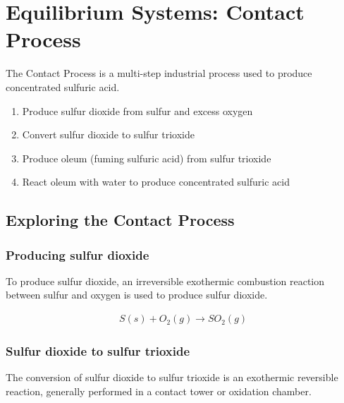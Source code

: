 \documentclass[12pt, a4paper]{article}
\begin{document}
\maketitle





\section{Equilibrium Systems: Contact Process}

The Contact Process is a multi-step industrial process used to produce concentrated sulfuric acid. 

\begin{enumerate}
	\item Produce sulfur dioxide from sulfur and excess oxygen
	\item Convert sulfur dioxide to sulfur trioxide
	\item Produce oleum (fuming sulfuric acid) from sulfur trioxide
	\item React oleum with water to produce concentrated sulfuric acid
\end{enumerate}






\subsection{Exploring the Contact Process}

\subsubsection{Producing sulfur dioxide}

To produce sulfur dioxide, an irreversible exothermic combustion reaction between sulfur and oxygen is used to produce sulfur dioxide.

\begin{align}
	S(s) + O_{2}(g) \rightarrow SO_{2}(g)
\end{align}

\subsubsection{Sulfur dioxide to sulfur trioxide}

The conversion of sulfur dioxide to sulfur trioxide is an exothermic reversible reaction, generally performed in a contact tower or oxidation chamber.
\end{document}
